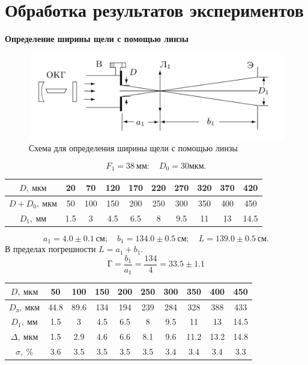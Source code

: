 \documentclass[10pt, a4paper]{article}
\begin{document}
\section*{Обработка результатов экспериментов}
\textbf{Определение ширины щели с помощью линзы}
\begin{figure}[H]
	\includegraphics[width = 1.0\linewidth]{1.png}
	\caption*{Схема для определения ширины щели с помощью линзы}
\end{figure}	
\[
 F_1 = 38\ мм: \quad D_0 = 30 мкм.
\]
\begin{table}[H]
	\centering
	\begin{tabular}{|c|c|c|c|c|c|c|c|c|c|}  \hline
	$D,\ мкм$ & 20 & 70 & 120 & 170 & 220 & 270 & 320 & 370 & 420 \\\hline
	$D + D_0,\ мкм$ & 50 & 100 & 150 & 200 & 250 & 300 & 350 & 400 & 450 \\\hline
	$D_1,\ мм$ & 1.5 & 3 & 4.5 & 6.5 & 8 & 9.5 & 11 & 13 & 14.5 \\\hline
	\end{tabular}
	\end{table}
\[
	a_1 = 4.0 \pm 0.1\ см; \quad b_1 = 134.0 \pm 0.5\ см; \quad L = 139.0 \pm 0.5\ см.
\]
В пределах погрешности $L = a_1 + b_1$. 
\[
Г = \frac{b_1}{a_1} = \frac{134}{4} = 33.5 \pm 1.1
\]
\begin{table}[H]
	\centering
	\begin{tabular}{|c|c|c|c|c|c|c|c|c|c|}  \hline
	$D,\ мкм$ & 50 & 100 & 150 & 200 & 250 & 300 & 350 & 400 & 450 \\\hline
	$D_л,\ мкм$ &  44.8 & 89.6 & 134 & 194 & 239 & 284 & 328 & 388 & 433 \\\hline
	$D_1,\ мм$ & 1.5 & 3 & 4.5 & 6.5 & 8 & 9.5 & 11 & 13 & 14.5 \\\hline
	$\Delta,\ мкм$ & 1.5 &2.9 & 4.6 & 6.6 & 8.1 & 9.6 & 11.2 & 13.2 & 14.8 \\\hline
	$\sigma,\ \%$ &	 3.6 & 3.5 & 3.5 & 3.5 & 3.5 & 3.4 & 3.4 & 3.4 & 3.3 \\\hline
	\end{tabular}
	\end{table}
	
\end{document}
